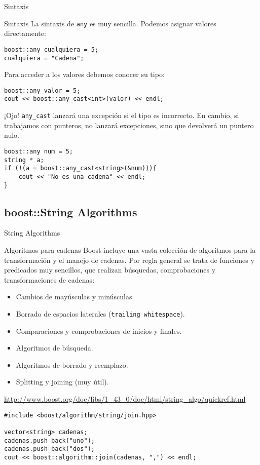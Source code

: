 \documentclass[8pt,xcolor=svgnames]{beamer}
\begin{document}
\begin{frame}[fragile]{Sintaxis}
  \begin{block}{Sintaxis}
    La sintaxis de \texttt{any} es muy sencilla. Podemos asignar valores directamente:
    {\small
\begin{verbatim}
boost::any cualquiera = 5;
cualquiera = "Cadena";
\end{verbatim}
    }

    Para acceder a los valores debemos conocer su tipo:
{\small
\begin{verbatim}
boost::any valor = 5;
cout << boost::any_cast<int>(valor) << endl;
\end{verbatim}
}

¡Ojo! \texttt{any\_cast} lanzará una excepción si el tipo es
incorrecto. En cambio, si trabajamos con punteros, no lanzará
excepciones, sino que devolverá un puntero nulo.  {\small
\begin{verbatim}
boost::any num = 5;
string * a;
if (!(a = boost::any_cast<string>(&num))){
    cout << "No es una cadena" << endl;
}
\end{verbatim}
}
  \end{block}
\end{frame}

\subsection{boost::String Algorithms}
\begin{frame}[fragile]{String Algorithms}
  \begin{block}{Algoritmos para cadenas}
    Boost incluye una vasta colección de algoritmos para la
    transformación y el manejo de cadenas. Por regla general se trata
    de funciones y predicados muy sencillos, que realizan búsquedas, comprobaciones y transformaciones de cadenas:
    \begin{itemize}
    \item Cambios de mayúsculas y minúsculas.
    \item Borrado de espacios laterales (\texttt{trailing whitespace}).
    \item Comparaciones y comprobaciones de inicios y finales.
    \item Algoritmos de búsqueda.
    \item Algoritmos de borrado y reemplazo.
    \item Splitting y joining (muy útil).
    \end{itemize}
\url{http://www.boost.org/doc/libs/1_43_0/doc/html/string_algo/quickref.html}
  \end{block}

  \begin{block}{}
    {\small
\begin{verbatim}
#include <boost/algorithm/string/join.hpp>

vector<string> cadenas;
cadenas.push_back("uno");
cadenas.push_back("dos");
cout << boost::algorithm::join(cadenas, ",") << endl;
\end{verbatim}
    }
  \end{block}
\end{frame}
\end{document}
